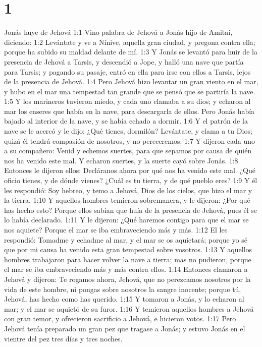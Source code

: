 
\chapter{1}

Jonás huye de Jehová  
1:1 Vino palabra de Jehová a Jonás hijo de Amitai, diciendo:  
1:2 Levántate y ve a Nínive, aquella gran ciudad, y pregona contra ella; porque ha subido su maldad delante de mí.  
1:3 Y Jonás se levantó para huir de la presencia de Jehová a Tarsis, y descendió a Jope, y halló una nave que partía para Tarsis; y pagando su pasaje, entró en ella para irse con ellos a Tarsis, lejos de la presencia de Jehová.  
1:4 Pero Jehová hizo levantar un gran viento en el mar, y hubo en el mar una tempestad tan grande que se pensó que se partiría la nave.  
1:5 Y los marineros tuvieron miedo, y cada uno clamaba a su dios; y echaron al mar los enseres que había en la nave, para descargarla de ellos. Pero Jonás había bajado al interior de la nave, y se había echado a dormir.  
1:6 Y el patrón de la nave se le acercó y le dijo: ¿Qué tienes, dormilón? Levántate, y clama a tu Dios; quizá él tendrá compasión de nosotros, y no pereceremos.  
1:7 Y dijeron cada uno a su compañero: Venid y echemos suertes, para que sepamos por causa de quién nos ha venido este mal. Y echaron suertes, y la suerte cayó sobre Jonás.  
1:8 Entonces le dijeron ellos: Decláranos ahora por qué nos ha venido este mal. ¿Qué oficio tienes, y de dónde vienes? ¿Cuál es tu tierra, y de qué pueblo eres?  
1:9 Y él les respondió: Soy hebreo, y temo a Jehová, Dios de los cielos, que hizo el mar y la tierra.  
1:10 Y aquellos hombres temieron sobremanera, y le dijeron: ¿Por qué has hecho esto? Porque ellos sabían que huía de la presencia de Jehová, pues él se lo había declarado.  
1:11 Y le dijeron: ¿Qué haremos contigo para que el mar se nos aquiete? Porque el mar se iba embraveciendo más y más.  
1:12 El les respondió: Tomadme y echadme al mar, y el mar se os aquietará; porque yo sé que por mi causa ha venido esta gran tempestad sobre vosotros. 
1:13 Y aquellos hombres trabajaron para hacer volver la nave a tierra; mas no pudieron, porque el mar se iba embraveciendo más y más contra ellos.  
1:14 Entonces clamaron a Jehová y dijeron: Te rogamos ahora, Jehová, que no perezcamos nosotros por la vida de este hombre, ni pongas sobre nosotros la sangre inocente; porque tú, Jehová, has hecho como has querido.  
1:15 Y tomaron a Jonás, y lo echaron al mar; y el mar se aquietó de su furor.  
1:16 Y temieron aquellos hombres a Jehová con gran temor, y ofrecieron sacrificio a Jehová, e hicieron votos.  
1:17 Pero Jehová tenía preparado un gran pez que tragase a Jonás; y estuvo Jonás en el vientre del pez tres días y tres noches. 

